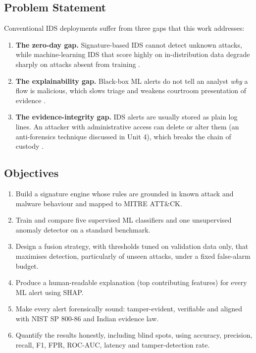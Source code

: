 \documentclass[12pt,a4paper,oneside]{article}
\begin{document}
\subsection{Problem Statement}
Conventional IDS deployments suffer from three gaps that this work addresses:
\begin{enumerate}[label=\textbf{P\arabic*.}]
  \item \textbf{The zero-day gap.} Signature-based IDS cannot detect unknown attacks, while machine-learning IDS that score highly on in-distribution data degrade sharply on attacks absent from training \cite{sommer2010outside,arp2022dos}.
  \item \textbf{The explainability gap.} Black-box ML alerts do not tell an analyst \emph{why} a flow is malicious, which slows triage and weakens courtroom presentation of evidence \cite{lundberg2017unified}.
  \item \textbf{The evidence-integrity gap.} IDS alerts are usually stored as plain log lines. An attacker with administrative access can delete or alter them (an anti-forensics technique discussed in Unit 4), which breaks the chain of custody \cite{schneier1999secure,kent2006sp80086}.
\end{enumerate}

\subsection{Objectives}
\begin{enumerate}[label=\textbf{O\arabic*.}]
  \item Build a signature engine whose rules are grounded in known attack and malware behaviour and mapped to MITRE ATT\&CK.
  \item Train and compare five supervised ML classifiers and one unsupervised anomaly detector on a standard benchmark.
  \item Design a fusion strategy, with thresholds tuned on validation data only, that maximises detection, particularly of unseen attacks, under a fixed false-alarm budget.
  \item Produce a human-readable explanation (top contributing features) for every ML alert using SHAP.
  \item Make every alert forensically sound: tamper-evident, verifiable and aligned with NIST SP 800-86 and Indian evidence law.
  \item Quantify the results honestly, including blind spots, using accuracy, precision, recall, F1, FPR, ROC-AUC, latency and tamper-detection rate.
\end{enumerate}
\end{document}

